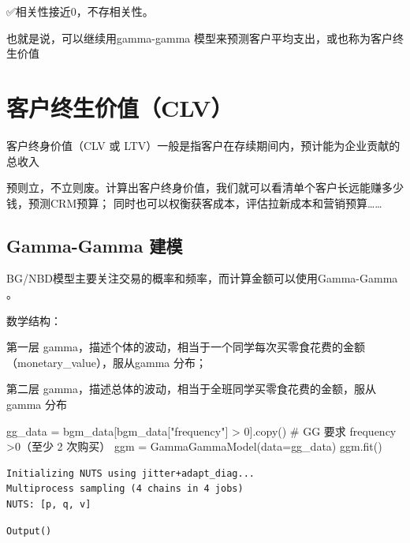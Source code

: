 \documentclass[
]{ctexart}
\newenvironment{Shaded}{\begin{snugshade}}{\end{snugshade}}
\newcommand{\CommentTok}[1]{\textcolor[rgb]{0.37,0.37,0.37}{#1}}
\newcommand{\DecValTok}[1]{\textcolor[rgb]{0.68,0.00,0.00}{#1}}
\newcommand{\NormalTok}[1]{\textcolor[rgb]{0.00,0.23,0.31}{#1}}
\newcommand{\OperatorTok}[1]{\textcolor[rgb]{0.37,0.37,0.37}{#1}}
\newcommand{\StringTok}[1]{\textcolor[rgb]{0.13,0.47,0.30}{#1}}
\begin{document}
✅相关性接近0，不存相关性。

也就是说，可以继续用gamma-gamma
模型来预测客户平均支出，或也称为客户终生价值

\section{客户终生价值（CLV）}\label{ux5ba2ux6237ux7ec8ux751fux4ef7ux503cclv}

客户终身价值（CLV 或
LTV）一般是指客户在存续期间内，预计能为企业贡献的总收入

预则立，不立则废。计算出客户终身价值，我们就可以看清单个客户长远能赚多少钱，预测CRM预算；
同时也可以权衡获客成本，评估拉新成本和营销预算\ldots\ldots{}

\subsection{Gamma-Gamma 建模}\label{gamma-gamma-ux5efaux6a21}

BG/NBD模型主要关注交易的概率和频率，而计算金额可以使用Gamma-Gamma 。

数学结构：

第一层
gamma，描述个体的波动，相当于一个同学每次买零食花费的金额（monetary\_value），服从gamma
分布；

第二层 gamma，描述总体的波动，相当于全班同学买零食花费的金额，服从gamma
分布

\begin{Shaded}
\begin{Highlighting}[]

\NormalTok{gg\_data }\OperatorTok{=}\NormalTok{ bgm\_data[bgm\_data[}\StringTok{"frequency"}\NormalTok{] }\OperatorTok{\textgreater{}} \DecValTok{0}\NormalTok{].copy() }\CommentTok{\# GG 要求 frequency \textgreater{}0（至少 2 次购买）}
\NormalTok{ggm }\OperatorTok{=}\NormalTok{ GammaGammaModel(data}\OperatorTok{=}\NormalTok{gg\_data)}
\NormalTok{ggm.fit()}
\end{Highlighting}
\end{Shaded}

\begin{verbatim}
Initializing NUTS using jitter+adapt_diag...
Multiprocess sampling (4 chains in 4 jobs)
NUTS: [p, q, v]
\end{verbatim}

\begin{verbatim}
Output()
\end{verbatim}

\begin{verbatim}
\end{verbatim}
\end{document}
